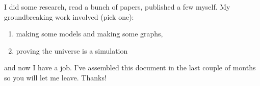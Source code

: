 \vcinfo{}

I did some research, read a bunch of papers, published a few myself. My groundbreaking work involved (pick one):
\begin{enumerate}
	\item making some models and making some graphs,
	\item proving the universe is a simulation
\end{enumerate}
and now I have a job.  I've assembled this document in the last couple of months so you will let me leave.  Thanks!